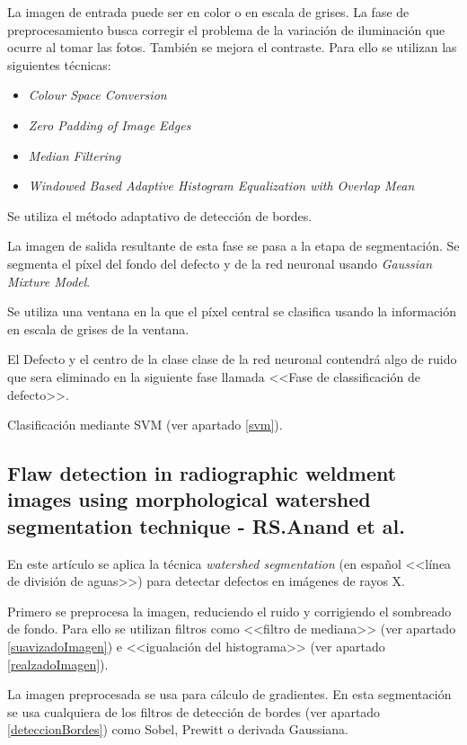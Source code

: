 La imagen de entrada puede ser en color o en escala de grises. La fase de preprocesamiento busca corregir el problema de la variación de iluminación que ocurre al tomar las fotos. También se mejora el contraste. Para ello se utilizan las siguientes técnicas:

\begin{itemize}
\item \emph{Colour Space Conversion}
\item \emph{Zero Padding of Image Edges}
\item \emph{Median Filtering}
\item \emph{Windowed Based Adaptive Histogram Equalization with Overlap Mean}
\end{itemize}

Se utiliza el método adaptativo de detección de bordes.

La imagen de salida resultante de esta fase se pasa a la etapa de segmentación. Se segmenta el píxel del fondo del defecto y de la red neuronal usando \textit{Gaussian Mixture Model}.

Se utiliza una ventana en la que el píxel central se clasifica usando la información en escala de grises de la ventana.

El Defecto y el centro de la clase clase de la red neuronal contendrá algo de ruido que sera eliminado en la siguiente fase llamada <<Fase de classificación de defecto>>.

Clasificación mediante SVM (ver apartado \ref{svm}).


\subsection{Flaw detection in radiographic weldment images using morphological watershed segmentation technique - RS.Anand et al.}
En este artículo \cite{anand2009flaw} se aplica la técnica \emph{watershed segmentation} \cite{Watershed79} (en español <<línea de división de aguas>>) para detectar defectos en imágenes de rayos X.

Primero se preprocesa la imagen, reduciendo el ruido y corrigiendo el sombreado de fondo. Para ello se utilizan filtros como <<filtro de mediana>> (ver apartado \ref{suavizadoImagen}) e <<igualación del histograma>> (ver apartado \ref{realzadoImagen}).

La imagen preprocesada se usa para cálculo de gradientes. En esta segmentación se usa cualquiera de los filtros de detección de bordes (ver apartado \ref{deteccionBordes}) como Sobel, Prewitt o derivada Gaussiana.

